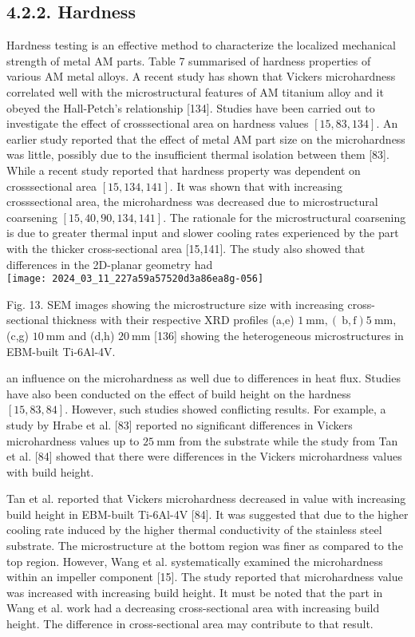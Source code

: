 \documentclass[10pt]{article}
\begin{document}
\subsection*{4.2.2. Hardness}
Hardness testing is an effective method to characterize the localized mechanical strength of metal AM parts. Table 7 summarised of hardness properties of various AM metal alloys. A recent study has shown that Vickers microhardness correlated well with the microstructural features of AM titanium alloy and it obeyed the Hall-Petch's relationship [134]. Studies have been carried out to investigate the effect of crosssectional area on hardness values $[15,83,134]$. An earlier study reported that the effect of metal AM part size on the microhardness was little, possibly due to the insufficient thermal isolation between them [83]. While a recent study reported that hardness property was dependent on crosssectional area $[15,134,141]$. It was shown that with increasing crosssectional area, the microhardness was decreased due to microstructural coarsening $[15,40,90,134,141]$. The rationale for the microstructural coarsening is due to greater thermal input and slower cooling rates experienced by the part with the thicker cross-sectional area [15,141]. The study also showed that differences in the 2D-planar geometry had\\
\texttt{[image: 2024\_03\_11\_227a59a57520d3a86ea8g-056]}

Fig. 13. SEM images showing the microstructure size with increasing cross-sectional thickness with their respective XRD profiles (a,e) $1 \mathrm{~mm},(\mathrm{~b}, \mathrm{f}) 5 \mathrm{~mm}$, (c,g) $10 \mathrm{~mm}$ and (d,h) $20 \mathrm{~mm}$ [136] showing the heterogeneous microstructures in EBM-built Ti-6Al-4V.

an influence on the microhardness as well due to differences in heat flux. Studies have also been conducted on the effect of build height on the hardness $[15,83,84]$. However, such studies showed conflicting results. For example, a study by Hrabe et al. [83] reported no significant differences in Vickers microhardness values up to $25 \mathrm{~mm}$ from the substrate while the study from Tan et al. [84] showed that there were differences in the Vickers microhardness values with build height.

Tan et al. reported that Vickers microhardness decreased in value with increasing build height in EBM-built Ti-6Al-4V [84]. It was suggested that due to the higher cooling rate induced by the higher thermal conductivity of the stainless steel substrate. The microstructure at the bottom region was finer as compared to the top region. However, Wang et al. systematically examined the microhardness within an impeller component [15]. The study reported that microhardness value was increased with increasing build height. It must be noted that the part in Wang et al. work had a decreasing cross-sectional area with increasing build height. The difference in cross-sectional area may contribute to that result.
\end{document}
